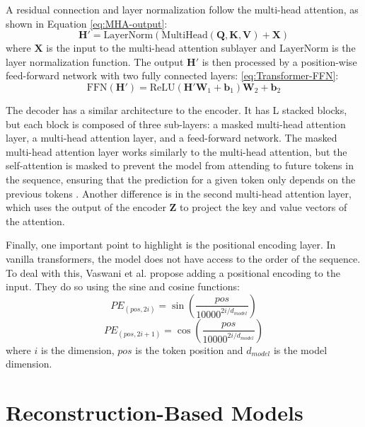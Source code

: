A residual connection and layer normalization follow the multi-head attention, as shown in Equation \ref{eq:MHA-output}:
\begin{equation}
    \boldsymbol{H}' = \text{LayerNorm}(\text{MultiHead}(\boldsymbol{Q}, \boldsymbol{K}, \boldsymbol{V}) + \boldsymbol{X})
    \label{eq:MHA-output}
\end{equation}
where $\boldsymbol{X}$ is the input to the multi-head attention sublayer and $\text{LayerNorm}$ is the layer normalization function. The output $\boldsymbol{H}'$ is then processed by a position-wise feed-forward network with two fully connected layers: \ref{eq:Transformer-FFN}:
\begin{equation}
    \text{FFN}(\boldsymbol{H}') = \text{ReLU}(\boldsymbol{H}'\boldsymbol{W}_1 + \boldsymbol{b}_1)\boldsymbol{W}_2 + \boldsymbol{b}_2
    \label{eq:Transformer-FFN}
\end{equation}

The decoder has a similar architecture to the encoder. It has L stacked blocks, but each block is composed of three sub-layers: a masked multi-head attention layer, a multi-head attention layer, and a feed-forward network. The masked multi-head attention layer works similarly to the multi-head attention, but the self-attention is masked to prevent the model from attending to future tokens in the sequence, ensuring that the prediction for a given token only depends on the previous tokens \cite{lin2021surveytransformers}. Another difference is in the second multi-head attention layer, which uses the output of the encoder $\boldsymbol{Z}$ to project the key and value vectors of the attention.

Finally, one important point to highlight is the positional encoding layer. In vanilla transformers, the model does not have access to the order of the sequence. To deal with this, Vaswani et al. \cite{vaswani2023attentionneed} propose adding a positional encoding to the input. They do so using the sine and cosine functions:
\begin{equation}
    PE_{(pos,2i)} = \sin\left(\frac{pos}{10000^{2i/d_{model}}}\right)
\end{equation}
\begin{equation}
    PE_{(pos,2i+1)} = \cos\left(\frac{pos}{10000^{2i/d_{model}}}\right)
\end{equation}
where $i$ is the dimension, $pos$ is the token position and $d_{model}$ is the model dimension.


\section{Reconstruction-Based Models}

